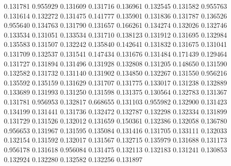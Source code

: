0.131781
0.955929
0.131609
0.131716
0.136961
0.132545
0.131582
0.955763
0.131614
0.132272
0.131475
0.141777
0.135901
0.131836
0.131787
0.136526
0.955640
0.134763
0.131790
0.131657
0.166261
0.134274
0.132026
0.132746
0.133534
0.131051
0.133534
0.131710
0.138123
0.131912
0.131695
0.132984
0.135583
0.131507
0.132242
0.135840
0.142641
0.131832
0.131675
0.131041
0.131709
0.132537
0.131541
0.147434
0.131676
0.131484
0.171439
0.129464
0.131727
0.131894
0.131496
0.131928
0.132808
0.131205
0.148650
0.131590
0.132582
0.131732
0.131140
0.131902
0.134850
0.132267
0.131550
0.956216
0.135592
0.135159
0.131629
0.131707
0.131775
0.133017
0.131238
0.132889
0.133689
0.131993
0.131250
0.131598
0.131375
0.130564
0.132783
0.131367
0.131781
0.956953
0.132817
0.668655
0.131103
0.955982
0.132900
0.131423
0.134199
0.131441
0.131736
0.132472
0.132787
0.132298
0.132334
0.131899
0.131729
0.131526
0.132012
0.131659
0.150361
0.132386
0.132058
0.136780
0.956653
0.131967
0.131595
0.135084
0.131416
0.131705
0.133111
0.132033
0.132154
0.131592
0.132017
0.131567
0.132715
0.135979
0.131688
0.131173
0.956178
0.131618
0.956084
0.131475
0.132113
0.132183
0.131241
0.130853
0.132924
0.132280
0.132582
0.132256
0.131897
